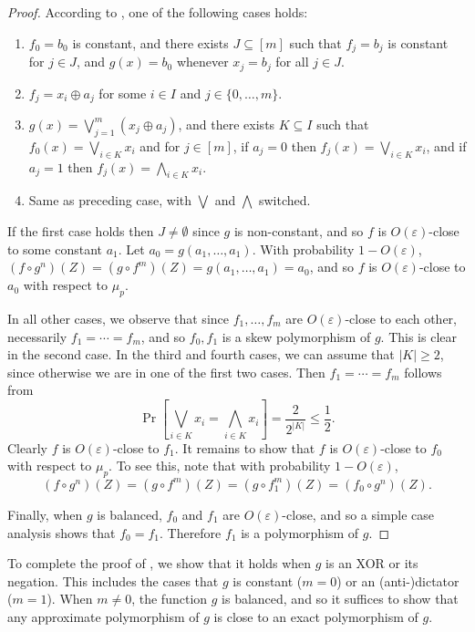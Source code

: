 \documentclass{article}
\theoremstyle{definition}
\theoremstyle{remark}
\providecommand{\biglor}{\bigvee}
\providecommand{\bigland}{\bigwedge}
\newcommand\eps{\varepsilon}
\renewcommand\epsilon{\eps}
\renewcommand\geq{\geqslant}
\renewcommand\leq{\leqslant}
\begin{document}
\begin{proof}
According to , one of the following cases holds:
\begin{enumerate}
    \item $f_0 = b_0$ is constant, and there exists $J \subseteq [m]$ such that $f_j = b_j$ is constant for $j \in J$, and $g(x) = b_0$ whenever $x_j = b_j$ for all $j \in J$.
    \item $f_j = x_i \oplus a_j$ for some $i \in I$ and $j \in \{0,\ldots,m\}$.
    \item $g(x) = \biglor_{j=1}^m (x_j \oplus a_j)$, and there exists $K \subseteq I$ such that $f_0(x) = \biglor_{i \in K} x_i$ and for $j \in [m]$, if $a_j = 0$ then $f_j(x) = \biglor_{i \in K} x_i$, and if $a_j = 1$ then $f_j(x) = \bigland_{i \in K} x_i$.
    \item Same as preceding case, with $\biglor$ and $\bigland$ switched.
\end{enumerate}

If the first case holds then $J \neq \emptyset$ since $g$ is non-constant, and so $f$ is $O(\epsilon)$-close to some constant $a_1$. Let $a_0 = g(a_1,\ldots,a_1)$. With probability $1 - O(\epsilon)$, $(f \circ g^n)(Z) = (g \circ f^m)(Z) = g(a_1,\ldots,a_1) = a_0$, and so $f$ is $O(\epsilon)$-close to $a_0$ with respect to $\mu_p$.

In all other cases, we observe that since $f_1,\ldots,f_m$ are $O(\epsilon)$-close to each other, necessarily $f_1 = \cdots = f_m$, and so $f_0,f_1$ is a skew polymorphism of $g$. This is clear in the second case. In the third and fourth cases, we can assume that $|K| \geq 2$, since otherwise we are in one of the first two cases. Then $f_1 = \cdots = f_m$ follows from
\[
 \Pr\left[ \biglor_{i \in K} x_i = \bigland_{i \in K} x_i \right] = \frac{2}{2^{|K|}} \leq \frac{1}{2}.
\]
Clearly $f$ is $O(\epsilon)$-close to $f_1$. It remains to show that $f$ is $O(\epsilon)$-close to $f_0$ with respect to $\mu_p$. To see this, note that with probability $1 - O(\epsilon)$,
\[
 (f \circ g^n)(Z) = (g \circ f^m)(Z) = (g \circ f_1^m)(Z) = (f_0 \circ g^n)(Z).
\]

Finally, when $g$ is balanced, $f_0$ and $f_1$ are $O(\epsilon)$-close, and so a simple case analysis shows that $f_0 = f_1$. Therefore $f_1$ is a polymorphism of $g$.
\end{proof}

To complete the proof of , we show that it holds when $g$ is an XOR or its negation. This includes the cases that $g$ is constant ($m = 0$) or an (anti-)dictator ($m = 1$). When $m \neq 0$, the function $g$ is balanced, and so it suffices to show that any approximate polymorphism of $g$ is close to an exact polymorphism of $g$.
\end{document}

